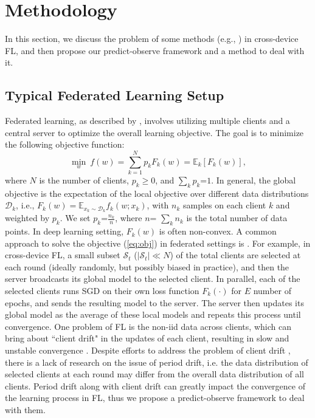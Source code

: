\section{Methodology}\label{sec:method}
In this section, we discuss the problem of some methods (e.g., \fedavg) in cross-device FL, and then propose our predict-observe framework and a method \fedeve to deal with it.  

\subsection{Typical Federated Learning Setup}\label{sec:fedavg}
Federated learning, as described by \citet{mcmahan2017communication}, involves utilizing multiple clients and a central server to optimize the overall learning objective. The goal is to minimize the following objective function:
\begin{equation}
\label{eq:obj}
\min_w~f(w) = \sum_{k=1}^N p_k F_k(w)= \mathbb{E}_k [F_k(w)],
\end{equation}
where $N$ is the number of clients, $p_k\geq 0$, and $\sum_k p_k$=$1$. In general, the global objective is the expectation of the local objective over different data distributions $\mathcal{D}_k$, i.e., $F_k(w) = \mathbb{E}_{x_k \sim \mathcal{D}_k}{f_k(w;x_k)}$, with $n_k$ samples on each client $k$ and weighted by $p_k$. We set $p_k$=$\frac{n_k}{n}$, where $n$= $\sum_k n_k$ is the total number of data points. In deep learning setting, $F_k(w)$ is often non-convex.
A common approach to solve the objective (\ref{eq:obj}) in federated settings is \fedavg  \citep{mcmahan2017communication}. For example, in cross-device FL, a small subset $\mathcal{S}_t$ ($|\mathcal{S}_t| \ll N$) of the total clients are selected at each round (ideally randomly, but possibly biased in practice), and then the server broadcasts its global model to the selected client. In parallel, each of the selected clients runs SGD on their own loss function  $F_k\left(\cdot\right)$ for $E$ number of epochs, and sends the resulting model to the server. The server then updates its global model as the average of these local models and repeats this process until convergence. 
One problem of FL is the non-iid data across clients, which can bring about ``client drift" in the updates of each client, resulting in slow and unstable convergence \citep{karimireddy2021scaffold}. Despite efforts to address the problem of client drift \citep{karimireddy2021scaffold,li2020federated,reddi2020adaptive}, there is a lack of research on the issue of period drift, i.e. the data distribution of selected clients at each round may differ from the overall data distribution of all clients. Period drift along with client drift can greatly impact the convergence of the learning process in FL, thus we propose a predict-observe framework to deal with them.

